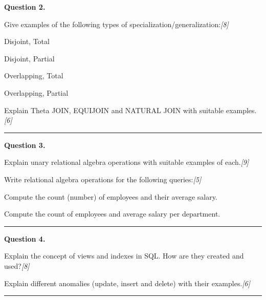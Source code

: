 \documentclass[11pt,a4paper]{article}
\newcommand{\pts}[1]{\hfill   \textit{[#1]}}
\begin{document}
\noindent   \textbf{Question 2.}

\begin{parts}
  \item Give examples of the following types of specialization/generalization:\pts{8}
  
\begin{parts}
    \item Disjoint, Total
    \item Disjoint, Partial
    \item Overlapping, Total
    \item Overlapping, Partial
  \end{parts}
  \item Explain Theta JOIN, EQUIJOIN and NATURAL JOIN with suitable examples.\pts{6}
\end{parts}

\medskip\rule{\linewidth}{0.2pt}\medskip




\noindent   \textbf{Question 3.}

\begin{parts}
  \item Explain unary relational algebra operations with suitable examples of each.\pts{9}
  \item Write relational algebra operations for the following queries:\pts{5}
  
\begin{parts}
    \item Compute the count (number) of employees and their average salary.
    \item Compute the count of employees and average salary per department.
  \end{parts}
\end{parts}

\medskip\rule{\linewidth}{0.2pt}\medskip




\noindent   \textbf{Question 4.}

\begin{parts}
  \item Explain the concept of views and indexes in SQL. How are they created and used?\pts{8}
  \item Explain different anomalies (update, insert and delete) with their examples.\pts{6}
\end{parts}

\medskip\rule{\linewidth}{0.2pt}\medskip
\end{document}
